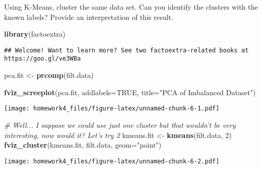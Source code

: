 \documentclass[
]{article}
\newenvironment{Shaded}{\begin{snugshade}}{\end{snugshade}}
\newcommand{\CommentTok}[1]{\textcolor[rgb]{0.56,0.35,0.01}{\textit{#1}}}
\newcommand{\DataTypeTok}[1]{\textcolor[rgb]{0.13,0.29,0.53}{#1}}
\newcommand{\DecValTok}[1]{\textcolor[rgb]{0.00,0.00,0.81}{#1}}
\newcommand{\KeywordTok}[1]{\textcolor[rgb]{0.13,0.29,0.53}{\textbf{#1}}}
\newcommand{\NormalTok}[1]{#1}
\newcommand{\OtherTok}[1]{\textcolor[rgb]{0.56,0.35,0.01}{#1}}
\newcommand{\StringTok}[1]{\textcolor[rgb]{0.31,0.60,0.02}{#1}}
\begin{document}
Using K-Means, cluster the same data set. Can you identify the clusters
with the known labels? Provide an interpretation of this result.

\begin{Shaded}
\begin{Highlighting}[]
\KeywordTok{library}\NormalTok{(factoextra)}
\end{Highlighting}
\end{Shaded}

\begin{verbatim}
## Welcome! Want to learn more? See two factoextra-related books at https://goo.gl/ve3WBa
\end{verbatim}

\begin{Shaded}
\begin{Highlighting}[]
\NormalTok{pca.fit <-}\StringTok{ }\KeywordTok{prcomp}\NormalTok{(filt.data)}

\KeywordTok{fviz_screeplot}\NormalTok{(pca.fit, }
               \DataTypeTok{addlabels=}\OtherTok{TRUE}\NormalTok{, }
               \DataTypeTok{title=}\StringTok{"PCA of Imbalanced Dataset"}\NormalTok{)}
\end{Highlighting}
\end{Shaded}

\texttt{[image: homework4\_files/figure-latex/unnamed-chunk-6-1.pdf]}

\begin{Shaded}
\begin{Highlighting}[]
\CommentTok{# Well... I suppose we could use just one cluster but that wouldn't be very interesting, now would it? Let's try 2}
\NormalTok{kmeans.fit <-}\StringTok{ }\KeywordTok{kmeans}\NormalTok{(filt.data, }\DecValTok{2}\NormalTok{)}
\KeywordTok{fviz_cluster}\NormalTok{(kmeans.fit, filt.data, }\DataTypeTok{geom=}\StringTok{"point"}\NormalTok{)}
\end{Highlighting}
\end{Shaded}

\texttt{[image: homework4\_files/figure-latex/unnamed-chunk-6-2.pdf]}
\end{document}
